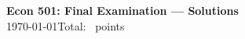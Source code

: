 \documentclass[11pt,addpoints,answers]{exam}
\begin{document}
\begin{center}
  {\large\bfseries Econ 501: Final Examination --- Solutions}\\[2pt]
  \today \qquad Total: \numpoints\ points
\end{center}
\vspace{1em}


\end{document}
